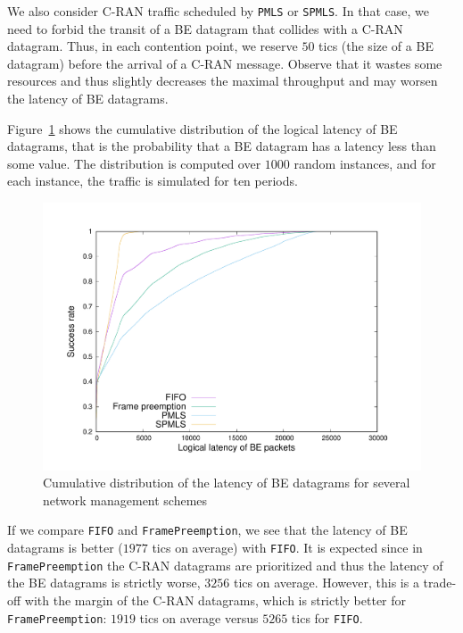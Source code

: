 \documentclass[a4paper,10pt]{journal}
\newcommand\PMLS{\texttt{PMLS}\xspace}
\newcommand\SPMLS{\texttt{SPMLS}\xspace}
\newcommand\FIFO{\texttt{FIFO}\xspace}
\newcommand\framepre{\texttt{FramePreemption}\xspace}
\begin{document}
   We also consider C-RAN traffic scheduled by \PMLS or \SPMLS. In that case, we need to forbid the transit of a BE datagram that collides with a C-RAN datagram. Thus, in each contention point, we reserve $50$ tics (the size of a BE datagram) before the arrival of a C-RAN message. Observe that it wastes some resources and thus slightly decreases the maximal throughput and may worsen the latency of BE datagrams.
    
    Figure~\ref{fig:belatency} shows the cumulative distribution of the logical latency of BE datagrams, that is the probability that a BE datagram has a latency less than some value.
    The distribution is computed over $1000$ random instances, and for each instance, the traffic is simulated for ten periods.

     \begin{figure}
       \begin{center}
      \includegraphics[width = 1\textwidth]{res.pdf}
      \end{center}
      \caption{Cumulative distribution of the latency of BE datagrams for several network management schemes}
      \label{fig:belatency}   
     \end{figure}    
     

     If we compare \FIFO and \framepre, we see that the latency of BE datagrams is better ($1977$ tics on average) with \FIFO. It is expected since in \framepre the C-RAN datagrams are prioritized and thus 
     the latency of the BE datagrams is strictly worse, $3256$ tics on average. However, this is a trade-off with the margin of the C-RAN datagrams, which is strictly better for \framepre: $1919$ tics on average versus $5265$ tics for \FIFO. 
\end{document}
